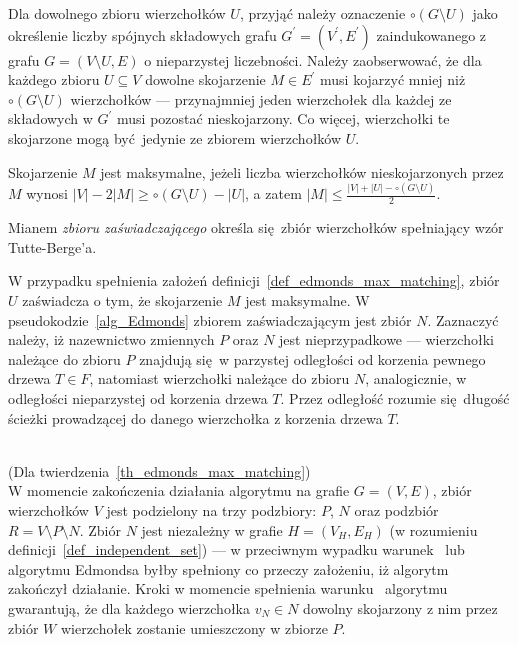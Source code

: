 {  Dla dowolnego zbioru wierzchołków $U$, przyjąć należy oznaczenie $\circ (G \setminus U)$ jako określenie liczby spójnych składowych grafu $G^\prime=(V^\prime, E^\prime)$ zaindukowanego z grafu $G=(V \setminus U, E)$ o nieparzystej liczebności.
  Należy zaobserwować, że dla każdego zbioru $U \subseteq V$ dowolne skojarzenie $M \in E^\prime$ musi kojarzyć mniej niż $\circ (G \setminus U)$ wierzchołków --- przynajmniej jeden wierzchołek dla każdej ze składowych w $G^\prime$ musi pozostać nieskojarzony.
  Co więcej, wierzchołki te skojarzone mogą być jedynie ze zbiorem wierzchołków $U$.
  \begin{definition}
    Skojarzenie $M$ jest maksymalne, jeżeli liczba wierzchołków nieskojarzonych przez $M$ wynosi $|V| - 2|M| \geq \circ (G \setminus U) - |U|$, a zatem $|M|\leq \frac{|V|+|U| - \circ (G \setminus U)}{2}$.
  \end{definition}
  \begin{definition}
  Mianem \emph{zbioru zaświadczającego} określa się zbiór wierzchołków spełniający wzór Tutte-Berge'a.
  \end{definition}
  W przypadku spełnienia założeń definicji~\ref{def_edmonds_max_matching}, zbiór $U$ zaświadcza o tym, że skojarzenie $M$ jest maksymalne.
  W pseudokodzie~\ref{alg_Edmonds} zbiorem zaświadczającym jest zbiór $N$.
  Zaznaczyć należy, iż nazewnictwo zmiennych $P$ oraz $N$ jest nieprzypadkowe --- wierzchołki należące do zbioru $P$ znajdują się w parzystej odległości od korzenia pewnego drzewa $T \in F$, natomiast wierzchołki należące do zbioru $N$, analogicznie, w odległości nieparzystej od korzenia drzewa $T$.
  Przez odległość rozumie się długość ścieżki prowadzącej do danego wierzchołka z korzenia drzewa $T$.\\\\
  \begin{bproof} (Dla twierdzenia~\ref{th_edmonds_max_matching})\\
    W momencie zakończenia działania algorytmu na grafie $G=(V, E)$, zbiór wierzchołków $V$ jest podzielony na trzy podzbiory: $P$, $N$ oraz podzbiór $R = V \setminus P \setminus N$.
    Zbiór $N$ jest niezależny w grafie $H=(V_H, E_H)$ (w rozumieniu definicji~\ref{def_independent_set}) --- w przeciwnym wypadku warunek~ lub~ algorytmu Edmondsa byłby spełniony co przeczy założeniu, iż algorytm zakończył działanie.
    Kroki w momencie spełnienia warunku~ algorytmu gwarantują, że dla każdego wierzchołka $v_N \in N$ dowolny skojarzony z nim przez zbiór $W$ wierzchołek zostanie umieszczony w zbiorze $P$.

\end{bproof}}
